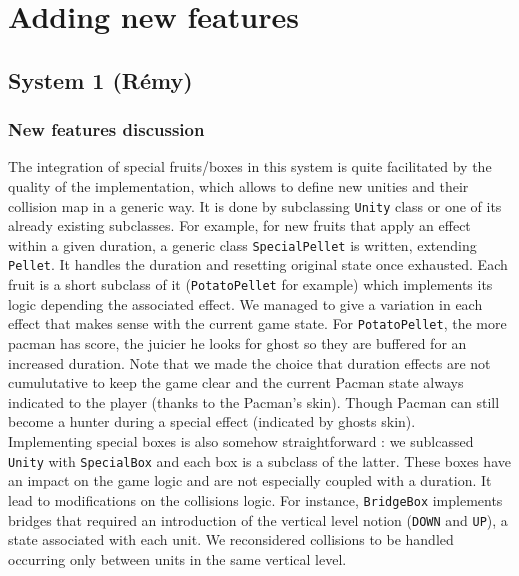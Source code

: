 \documentclass[]{article}
\begin{document}
\newpage
\section{Adding new features}
\subsection{System 1 (Rémy)}

\subsubsection{New features discussion}

\indent\par The integration of special fruits/boxes in this system is quite facilitated by the quality of the implementation, which allows to define new unities and their collision map in a generic way. It is done by subclassing \texttt{Unity} class or one of its already existing subclasses. For example, for new fruits that apply an effect within a given duration, a generic class \texttt{SpecialPellet} is written, extending \texttt{Pellet}. It handles the duration and resetting original state once exhausted. Each fruit is a short subclass of it (\texttt{PotatoPellet} for example) which implements its logic depending the associated effect. We managed to give a variation in each effect that makes sense with the current game state. For \texttt{PotatoPellet}, the more pacman has score, the juicier he looks for ghost so they are buffered for an increased duration. Note that we made the choice that duration effects are not cumulutative to keep the game clear and the current Pacman state always indicated to the player (thanks to the Pacman's skin). Though Pacman can still become a hunter during a special effect (indicated by ghosts skin).\\

Implementing special boxes is also somehow straightforward : we sublcassed \texttt{Unity} with \texttt{SpecialBox} and each box is a subclass of the latter. These boxes have an impact on the game logic and are not especially coupled with a duration. It lead to modifications on the collisions logic. For instance, \texttt{BridgeBox} implements bridges that required an introduction of the vertical level notion (\texttt{DOWN} and \texttt{UP}), a state associated with each unit. We reconsidered collisions to be handled occurring only between units in the same vertical level.\\
\end{document}
